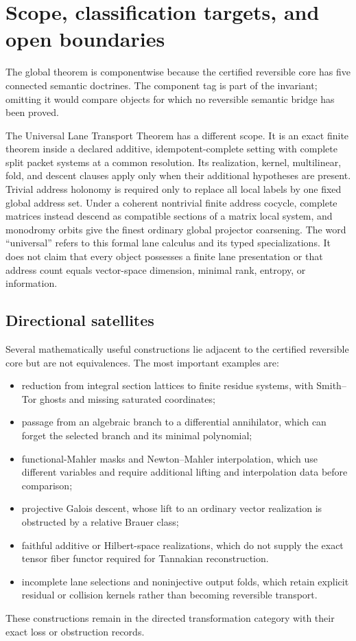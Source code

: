 \section{Scope, classification targets, and open boundaries}
\label{sec:publication-scope}

The global theorem is componentwise because the certified reversible core has five connected semantic doctrines.  The component tag is part of the invariant; omitting it would compare objects for which no reversible semantic bridge has been proved.

The Universal Lane Transport Theorem has a different scope.  It is an exact finite theorem inside a declared additive, idempotent-complete setting with complete split packet systems at a common resolution.  Its realization, kernel, multilinear, fold, and descent clauses apply only when their additional hypotheses are present.  Trivial address holonomy is required only to replace all local labels by one fixed global address set.  Under a coherent nontrivial finite address cocycle, complete matrices instead descend as compatible sections of a matrix local system, and monodromy orbits give the finest ordinary global projector coarsening.  The word ``universal'' refers to this formal lane calculus and its typed specializations.  It does not claim that every object possesses a finite lane presentation or that address count equals vector-space dimension, minimal rank, entropy, or information.



\subsection{Directional satellites}

Several mathematically useful constructions lie adjacent to the certified reversible core but are not equivalences.  The most important examples are:
\begin{itemize}
\item reduction from integral section lattices to finite residue systems, with Smith--Tor ghosts and missing saturated coordinates;
\item passage from an algebraic branch to a differential annihilator, which can forget the selected branch and its minimal polynomial;
\item functional-Mahler masks and Newton--Mahler interpolation, which use different variables and require additional lifting and interpolation data before comparison;
\item projective Galois descent, whose lift to an ordinary vector realization is obstructed by a relative Brauer class;
\item faithful additive or Hilbert-space realizations, which do not supply the exact tensor fiber functor required for Tannakian reconstruction.
\item incomplete lane selections and noninjective output folds, which retain explicit residual or collision kernels rather than becoming reversible transport.
\end{itemize}
These constructions remain in the directed transformation category with their exact loss or obstruction records.

